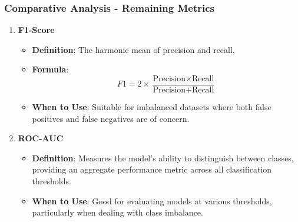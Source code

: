 \documentclass[aspectratio=169]{beamer}
\begin{document}
\begin{frame}[fragile]
    \frametitle{Comparative Analysis - Remaining Metrics}
    \begin{enumerate}[start=4]
        \item \textbf{F1-Score}
            \begin{itemize}
                \item \textbf{Definition}: The harmonic mean of precision and recall.
                \item \textbf{Formula}:
                \[
                F1 = 2 \times \frac{\text{Precision} \times \text{Recall}}{\text{Precision} + \text{Recall}}
                \]
                \item \textbf{When to Use}: Suitable for imbalanced datasets where both false positives and false negatives are of concern.
            \end{itemize}

        \item \textbf{ROC-AUC}
            \begin{itemize}
                \item \textbf{Definition}: Measures the model's ability to distinguish between classes, providing an aggregate performance metric across all classification thresholds.
                \item \textbf{When to Use}: Good for evaluating models at various thresholds, particularly when dealing with class imbalance.
            \end{itemize}
    \end{enumerate}
\end{frame}
\end{document}
